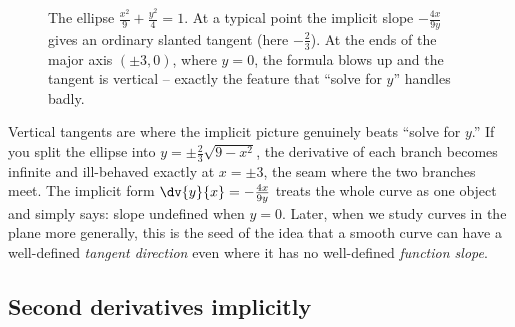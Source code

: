 \begin{figure}[H]
\centering
{}
\caption{The ellipse $\tfrac{x^2}{9}+\tfrac{y^2}{4}=1$. At a typical point the implicit slope
$-\tfrac{4x}{9y}$ gives an ordinary slanted tangent (here $-\tfrac23$). At the ends of the major
axis $(\pm 3,0)$, where $y=0$, the formula blows up and the tangent is vertical -- exactly the
feature that ``solve for $y$'' handles badly.}
\label{ch13:fig-ellipse}
\end{figure}

\begin{connectionbox}
Vertical tangents are where the implicit picture genuinely beats ``solve for $y$.'' If you split the
ellipse into $y = \pm\tfrac{2}{3}\sqrt{9-x^2}$, the derivative of each branch becomes infinite and
ill-behaved exactly at $x=\pm 3$, the seam where the two branches meet. The implicit form
$\dv{y}{x} = -\tfrac{4x}{9y}$ treats the whole curve as one object and simply says: slope undefined
when $y=0$. Later, when we study curves in the plane more generally, this is the seed of the idea
that a smooth curve can have a well-defined \emph{tangent direction} even where it has no
well-defined \emph{function slope}.
\end{connectionbox}

\subsection{Second derivatives implicitly}

